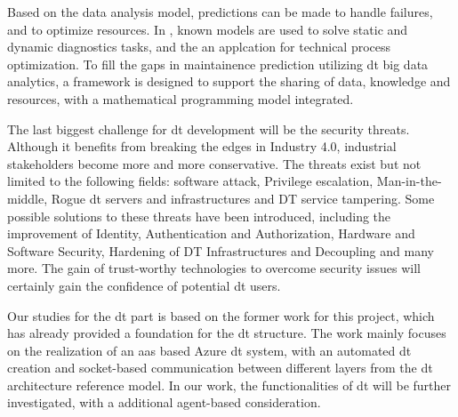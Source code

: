 Based on the data analysis model, predictions can be made to handle failures, and 
to optimize resources. In \cite{katalinic_digital_2018}, known models are used to solve static and dynamic 
diagnostics tasks, and the an applcation for technical process optimization. To fill the 
gaps in maintainence prediction utilizing \gls{dt} big data analytics, a framework 
is designed to support the sharing of data, knowledge and resources, with a 
mathematical programming model integrated\cite{mi_prediction_2021}. 


The last biggest challenge for \gls{dt} development will be the security threats. 
Although it benefits from breaking the edges in Industry 4.0, industrial stakeholders 
become more and more conservative. The threats exist but not limited to the following 
fields: software attack, Privilege escalation, Man-in-the-middle, Rogue \gls{dt} 
servers and infrastructures and DT service tampering. Some possible solutions to these 
threats have been introduced, including the improvement of Identity, Authentication 
and Authorization, 
Hardware and Software Security, Hardening of DT Infrastructures and Decoupling and many 
more. The gain of trust-worthy technologies to overcome security issues will certainly 
gain the confidence of potential \gls{dt} users. 



Our studies for the \gls{dt} part is based on the 
former work for this 
project, which has already provided a foundation for the \gls{dt} 
structure\cite{hofgen_architecture_2023}. 
The work mainly focuses on the realization of an \gls{aas} based Azure \gls{dt} system, 
with an automated \gls{dt} creation and socket-based communication between 
different layers from the \gls{dt} architecture reference 
model\cite[fig.5]{aheleroff_digital_2021}. In our work, the functionalities of \gls{dt} 
will be further investigated, with a additional agent-based consideration. 




